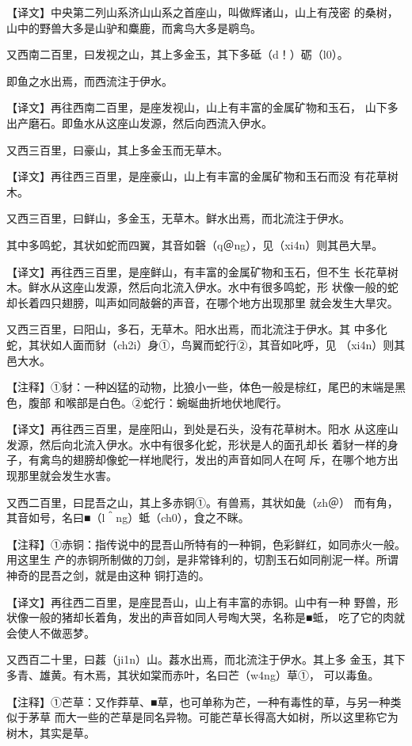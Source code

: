 \documentclass[a4paper,12pt,UTF8,twoside]{ctexbook}
\begin{document}
【译文】中央第二列山系济山山系之首座山，叫做辉诸山，山上有茂密 的桑树，山中的野兽大多是山驴和麋鹿，而禽鸟大多是鹖鸟。

又西南二百里，曰发视之山，其上多金玉，其下多砥（d！）砺（l0）。

即鱼之水出焉，而西流注于伊水。

【译文】再往西南二百里，是座发视山，山上有丰富的金属矿物和玉石， 山下多出产磨石。即鱼水从这座山发源，然后向西流入伊水。

又西三百里，曰豪山，其上多金玉而无草木。

【译文】再往西三百里，是座豪山，山上有丰富的金属矿物和玉石而没 有花草树木。

又西三百里，曰鲜山，多金玉，无草木。鲜水出焉，而北流注于伊水。

其中多鸣蛇，其状如蛇而四翼，其音如磬（q＠ng），见（xi4n）则其邑大旱。

【译文】再往西三百里，是座鲜山，有丰富的金属矿物和玉石，但不生 长花草树木。鲜水从这座山发源，然后向北流入伊水。水中有很多鸣蛇，形 状像一般的蛇却长着四只翅膀，叫声如同敲磐的声音，在哪个地方出现那里 就会发生大旱灾。

又西三百里，曰阳山，多石，无草木。阳水出焉，而北流注于伊水。其 中多化蛇，其状如人面而豺（ch2i）身①，鸟翼而蛇行②，其音如叱呼，见 （xi4n）则其邑大水。

【注释】①豺：一种凶猛的动物，比狼小一些，体色一般是棕红，尾巴的末端是黑色，腹部 和喉部是白色。②蛇行：蜿蜒曲折地伏地爬行。

【译文】再往西三百里，是座阳山，到处是石头，没有花草树木。阳水 从这座山发源，然后向北流入伊水。水中有很多化蛇，形状是人的面孔却长 着豺一样的身子，有禽鸟的翅膀却像蛇一样地爬行，发出的声音如同人在呵 斥，在哪个地方出现那里就会发生水害。

又西二百里，曰昆吾之山，其上多赤铜①。有兽焉，其状如彘（zh＠） 而有角，其音如号，名曰■（l＾ng）蚳（ch0），食之不眯。

【注释】①赤铜：指传说中的昆吾山所特有的一种铜，色彩鲜红，如同赤火一般。用这里生 产的赤铜所制做的刀剑，是非常锋利的，切割玉石如同削泥一样。所谓神奇的昆吾之剑，就是由这种 铜打造的。

【译文】再往西二百里，是座昆吾山，山上有丰富的赤铜。山中有一种 野兽，形状像一般的猪却长着角，发出的声音如同人号啕大哭，名称是■蚳， 吃了它的肉就会使人不做恶梦。

又西百二十里，曰葌（ji1n）山。葌水出焉，而北流注于伊水。其上多 金玉，其下多青、雄黄。有木焉，其状如棠而赤叶，名曰芒（w4ng）草①， 可以毒鱼。

【注释】①芒草：又作莽草、■草，也可单称为芒，一种有毒性的草，与另一种类似于茅草 而大一些的芒草是同名异物。可能芒草长得高大如树，所以这里称它为树木，其实是草。
\end{document}
